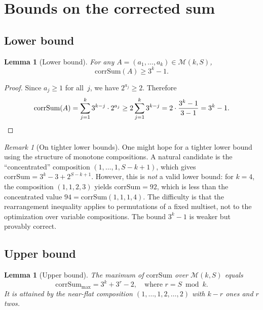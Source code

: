 \documentclass[11pt, a4paper]{amsart}
\theoremstyle{plain}
\newtheorem{lemma}[theorem]{Lemma}
\theoremstyle{definition}
\theoremstyle{remark}
\newtheorem{remark}[theorem]{Remark}
\newcommand{\corrSum}{\mathrm{corrSum}}
\newcommand{\Mono}{\mathcal{M}}
\begin{document}
\section{Bounds on the corrected sum}\label{sec:bounds}

\subsection{Lower bound}\label{ssec:lower}

\begin{lemma}[Lower bound]\label{lem:cs-min}
  For any $A = (a_1, \ldots, a_k) \in \Mono(k, S)$,
  \[
    \corrSum(A) \geq 3^k - 1.
  \]
\end{lemma}

\begin{proof}
  Since $a_j \geq 1$ for all~$j$, we have $2^{a_j} \geq 2$.
  Therefore
  \[
    \corrSum(A) = \sum_{j=1}^{k} 3^{k-j} \cdot 2^{a_j}
    \geq 2 \sum_{j=1}^{k} 3^{k-j}
    = 2 \cdot \frac{3^k - 1}{3 - 1}
    = 3^k - 1. \qedhere
  \]
\end{proof}

\begin{remark}[On tighter lower bounds]\label{rem:cs-min-erratum}
  One might hope for a tighter lower bound using the structure of
  monotone compositions.  A natural candidate is the
  ``concentrated'' composition $(1, \ldots, 1, S-k+1)$, which gives
  $\corrSum = 3^k - 3 + 2^{S-k+1}$.  However, this is \emph{not}
  a valid lower bound: for $k=4$, the composition $(1,1,2,3)$
  yields $\corrSum = 92$, which is less than the concentrated value
  $94 = \corrSum(1,1,1,4)$.  The difficulty is that the rearrangement
  inequality applies to permutations of a fixed multiset, not to
  the optimization over variable compositions.
  The bound $3^k - 1$ is weaker but provably correct.
\end{remark}

\subsection{Upper bound}\label{ssec:upper}

\begin{lemma}[Upper bound]\label{lem:cs-max}
  The maximum of $\corrSum$ over $\Mono(k, S)$ equals
  \[
    \corrSum_{\max} = 3^k + 3^r - 2,
    \quad\text{where } r = S \bmod k.
  \]
  It is attained by the near-flat composition
  $(1, \ldots, 1, 2, \ldots, 2)$ with $k - r$ ones and $r$ twos.
\end{lemma}
\end{document}
